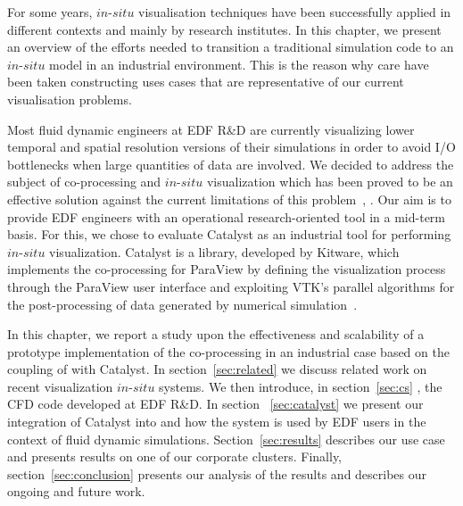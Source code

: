 For some years, $in$-$situ$ visualisation techniques have been successfully 
applied in different contexts and mainly by research institutes. 
In this chapter, we present an overview of the efforts 
needed to transition a traditional simulation code to an $in$-$situ$ model 
in an industrial environment. This is the reason why care have been taken 
constructing uses cases that are representative of our current visualisation problems. 

Most fluid dynamic engineers at EDF R\&D are currently visualizing lower temporal and spatial 
resolution versions of their simulations in order to avoid I/O bottlenecks when large quantities of data are involved.
We decided to address the subject of co-processing and $in$-$situ$
visualization which has been proved to be an effective solution against the current
limitations of this problem~\cite{sandiareport}, \cite{4090186}. Our aim is to provide 
EDF engineers with an operational research-oriented tool in a mid-term basis.
For this, we chose to evaluate Catalyst as an industrial tool for performing
$in$-$situ$ visualization. 
Catalyst is a library, developed by Kitware, which implements the
co-processing for ParaView by defining the visualization process through the ParaView user 
interface and exploiting VTK's parallel algorithms for the post-processing of data 
generated by numerical simulation~\cite{6092322}. 

In this chapter, we report a study upon the effectiveness and scalability of a
prototype implementation of the co-processing in an industrial case based on the
coupling of \CS with Catalyst. In section~\ref{sec:related} we
discuss related work on recent visualization $in$-$situ$ systems. We then
introduce, in section~\ref{sec:cs} \CS, the CFD code developed at EDF
R\&D. In section ~\ref{sec:catalyst} we present our integration of Catalyst into
\CS and how the system is used by EDF users in the context of fluid dynamic
simulations. Section~\ref{sec:results} describes our use case and presents
results on one of our corporate clusters. Finally, section~\ref{sec:conclusion} 
presents our analysis of the results and describes our ongoing and future work.
